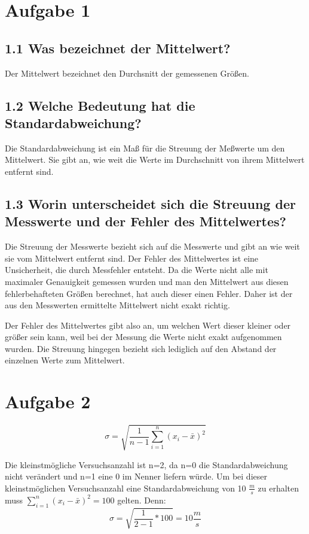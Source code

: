 \documentclass{scrartcl}
\begin{document}
\section{Aufgabe 1}
\subsection{1.1 Was bezeichnet der Mittelwert?}

Der Mittelwert bezeichnet den Durchsnitt der gemessenen Größen.

\subsection{1.2 Welche Bedeutung hat die Standardabweichung?}

Die Standardabweichung ist ein Maß für die Streuung der Meßwerte um den Mittelwert.
Sie gibt an, wie weit die Werte im Durchschnitt von ihrem Mittelwert entfernt sind.

\subsection{1.3 Worin unterscheidet sich die Streuung der Messwerte und der Fehler des Mittelwertes?}

Die Streuung der Messwerte bezieht sich auf die Messwerte und gibt an wie weit sie vom Mittelwert entfernt sind.
Der Fehler des Mittelwertes ist eine Unsicherheit, die durch Messfehler entsteht.
Da die Werte nicht alle mit maximaler Genauigkeit gemessen wurden und man den Mittelwert aus diesen fehlerbehafteten Größen berechnet,
hat auch dieser einen Fehler.
Daher ist der aus den Messwerten ermittelte Mittelwert nicht exakt richtig. 

Der Fehler des Mittelwertes gibt also an, um welchen Wert dieser kleiner oder größer sein kann, weil bei der Messung die Werte nicht exakt aufgenommen wurden.
Die Streuung hingegen bezieht sich lediglich auf den Abstand der einzelnen Werte zum Mittelwert.

\section{Aufgabe 2}

\begin{displaymath}
    \sigma = \sqrt{\frac{1}{n-1} \sum_{i=1}^{n} (x_i - \bar{x})^2}
\end{displaymath}

Die kleinstmögliche Versuchsanzahl ist n=2, da n=0 die Standardabweichung nicht verändert und n=1 eine 0 im Nenner liefern würde.
Um bei dieser kleinstmöglichen Versuchsanzahl eine Standardabweichung von 10 $\frac{m}{s}$ zu erhalten muss $\sum_{i=1}^{n} (x_i - \bar{x})^2 = 100$ gelten.
Denn:
\begin{displaymath}
    \sigma = \sqrt{\frac{1}{2-1} * 100 } = 10 \frac{m}{s}
\end{displaymath}
\end{document}
